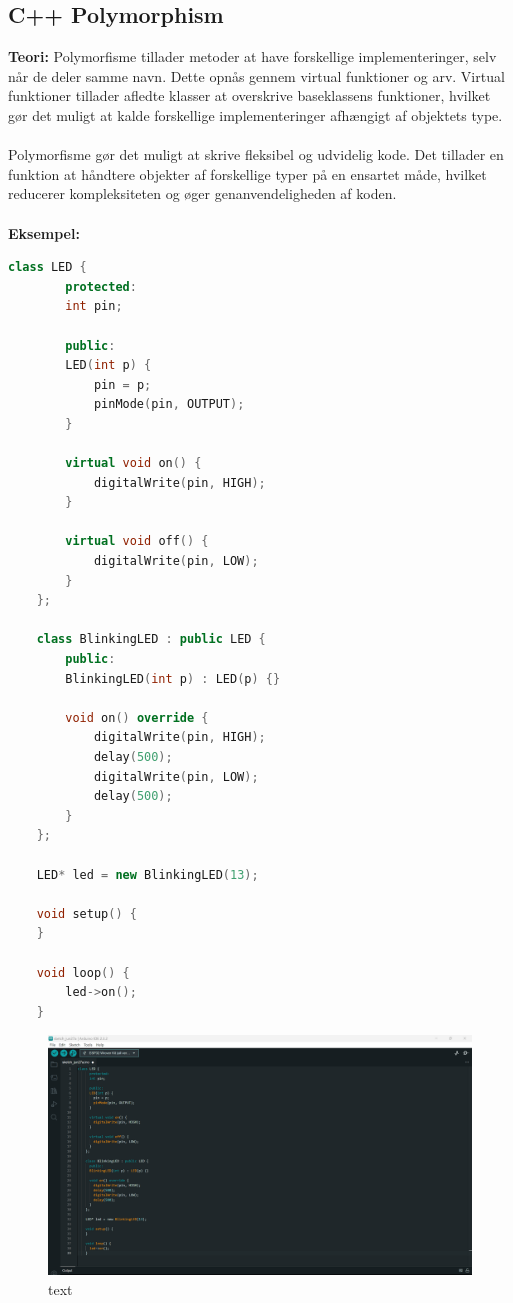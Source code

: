 \subsection{C++ Polymorphism}
\textbf{Teori:} Polymorfisme tillader metoder at have forskellige implementeringer, selv når de deler samme navn. Dette opnås gennem virtual funktioner og arv. Virtual funktioner tillader afledte klasser at overskrive baseklassens funktioner, hvilket gør det muligt at kalde forskellige implementeringer afhængigt af objektets type.
\\\\
\noindent Polymorfisme gør det muligt at skrive fleksibel og udvidelig kode. Det tillader en funktion at håndtere objekter af forskellige typer på en ensartet måde, hvilket reducerer kompleksiteten og øger genanvendeligheden af koden.
\\\\
\noindent\textbf{Eksempel:}
\begin{lstlisting}[language=C++]
	class LED {
		protected:
		int pin;
		
		public:
		LED(int p) {
			pin = p;
			pinMode(pin, OUTPUT);
		}
		
		virtual void on() {
			digitalWrite(pin, HIGH);
		}
		
		virtual void off() {
			digitalWrite(pin, LOW);
		}
	};
	
	class BlinkingLED : public LED {
		public:
		BlinkingLED(int p) : LED(p) {}
		
		void on() override {
			digitalWrite(pin, HIGH);
			delay(500);
			digitalWrite(pin, LOW);
			delay(500);
		}
	};
	
	LED* led = new BlinkingLED(13);
	
	void setup() {
	}
	
	void loop() {
		led->on();
	}
\end{lstlisting}
\begin{figure}[h!]
	\centering
	\includegraphics[width=\textwidth]{fig/fig20.png}
	\caption{text}
	\label{fig:20}
\end{figure}

